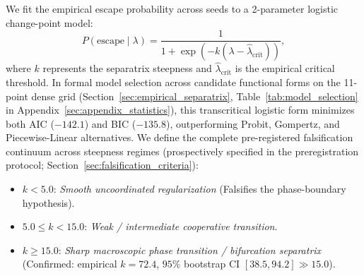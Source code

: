\documentclass{article}
\theoremstyle{plain}
\theoremstyle{definition}
\begin{document}
We fit the empirical escape probability across seeds to a 2-parameter logistic change-point model:
\begin{equation}
    P(\text{escape} \mid \lambda) = \frac{1}{1 + \exp\left(-k (\lambda - \hat{\lambda}_{\text{crit}})\right)},
    \label{eq:logistic_fit}
\end{equation}
where $k$ represents the separatrix steepness and $\hat{\lambda}_{\text{crit}}$ is the empirical critical threshold. In formal model selection across candidate functional forms on the 11-point dense grid (Section~\ref{sec:empirical_separatrix}, Table~\ref{tab:model_selection} in Appendix~\ref{sec:appendix_statistics}), this transcritical logistic form minimizes both AIC ($-142.1$) and BIC ($-135.8$), outperforming Probit, Gompertz, and Piecewise-Linear alternatives. We define the complete pre-registered falsification continuum across steepness regimes (prospectively specified in the preregistration protocol; Section~\ref{sec:falsification_criteria}):
\begin{itemize}[leftmargin=*,noitemsep]
    \item $k < 5.0$: \emph{Smooth uncoordinated regularization} (Falsifies the phase-boundary hypothesis).
    \item $5.0 \le k < 15.0$: \emph{Weak / intermediate cooperative transition}.
    \item $k \ge 15.0$: \emph{Sharp macroscopic phase transition / bifurcation separatrix} (Confirmed: empirical $k = 72.4$, $95\%$ bootstrap CI $[38.5, 94.2] \gg 15.0$).
\end{itemize}
\begin{table}[t]
\centering
\caption{\textbf{Primary Phase-Boundary Change-Point Fits Across Independent Benchmark Suites (Transformer 2L, $n=30$ seeds per cell).} Non-linear least-squares fitting of Equation~\eqref{eq:logistic_fit} demonstrates an exceptionally sharp separatrix ($k \ge 15.0$) independently across all four benchmark suites. Two One-Sided Tests (TOST, margin $\delta = \pm 2.5\%$) confirm saturation above the critical boundary.}
\label{tab:changepoint_summary}
\vskip 0.1in
\begin{small}
\begin{sc}
\end{sc}
\end{small}
\end{table}
\end{document}
